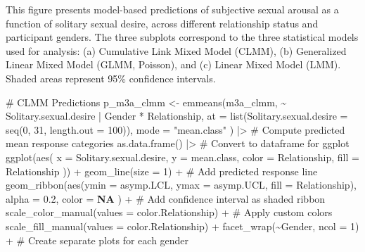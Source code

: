 \documentclass[
  bookmarksnumbered]{article}
\newenvironment{Shaded}{\begin{snugshade}}{\end{snugshade}}
\newcommand{\AttributeTok}[1]{\textcolor[rgb]{0.80,0.80,0.80}{#1}}
\newcommand{\CommentTok}[1]{\textcolor[rgb]{0.50,0.62,0.50}{#1}}
\newcommand{\ConstantTok}[1]{\textcolor[rgb]{0.86,0.64,0.64}{\textbf{#1}}}
\newcommand{\DecValTok}[1]{\textcolor[rgb]{0.86,0.86,0.80}{#1}}
\newcommand{\FloatTok}[1]{\textcolor[rgb]{0.75,0.75,0.82}{#1}}
\newcommand{\FunctionTok}[1]{\textcolor[rgb]{0.94,0.94,0.56}{#1}}
\newcommand{\NormalTok}[1]{\textcolor[rgb]{0.80,0.80,0.80}{#1}}
\newcommand{\OtherTok}[1]{\textcolor[rgb]{0.94,0.94,0.56}{#1}}
\newcommand{\SpecialCharTok}[1]{\textcolor[rgb]{0.86,0.64,0.64}{#1}}
\newcommand{\StringTok}[1]{\textcolor[rgb]{0.80,0.58,0.58}{#1}}
\begin{document}
This figure presents model-based predictions of subjective sexual arousal as a function of solitary sexual desire, across different relationship status and participant genders. The three subplots correspond to the three statistical models used for analysis: (a) Cumulative Link Mixed Model (CLMM), (b) Generalized Linear Mixed Model (GLMM, Poisson), and (c) Linear Mixed Model (LMM). Shaded areas represent 95\% confidence intervals.

\begin{Shaded}
\begin{Highlighting}[]
\CommentTok{\# CLMM Predictions}
\NormalTok{p\_m3a\_clmm }\OtherTok{\textless{}{-}} \FunctionTok{emmeans}\NormalTok{(m3a\_clmm, }\SpecialCharTok{\textasciitilde{}}\NormalTok{ Solitary.sexual.desire }\SpecialCharTok{|}\NormalTok{ Gender }\SpecialCharTok{*}\NormalTok{ Relationship,}
  \AttributeTok{at =} \FunctionTok{list}\NormalTok{(}\AttributeTok{Solitary.sexual.desire =} \FunctionTok{seq}\NormalTok{(}\DecValTok{0}\NormalTok{, }\DecValTok{31}\NormalTok{, }\AttributeTok{length.out =} \DecValTok{100}\NormalTok{)),}
  \AttributeTok{mode =} \StringTok{"mean.class"}
\NormalTok{) }\SpecialCharTok{|\textgreater{}} \CommentTok{\# Compute predicted mean response categories}
  \FunctionTok{as.data.frame}\NormalTok{() }\SpecialCharTok{|\textgreater{}} \CommentTok{\# Convert to dataframe for ggplot}
  \FunctionTok{ggplot}\NormalTok{(}\FunctionTok{aes}\NormalTok{(}
    \AttributeTok{x =}\NormalTok{ Solitary.sexual.desire, }\AttributeTok{y =}\NormalTok{ mean.class,}
    \AttributeTok{color =}\NormalTok{ Relationship, }\AttributeTok{fill =}\NormalTok{ Relationship}
\NormalTok{  )) }\SpecialCharTok{+}
  \FunctionTok{geom\_line}\NormalTok{(}\AttributeTok{size =} \DecValTok{1}\NormalTok{) }\SpecialCharTok{+} \CommentTok{\# Add predicted response line}
  \FunctionTok{geom\_ribbon}\NormalTok{(}\FunctionTok{aes}\NormalTok{(}\AttributeTok{ymin =}\NormalTok{ asymp.LCL, }\AttributeTok{ymax =}\NormalTok{ asymp.UCL, }\AttributeTok{fill =}\NormalTok{ Relationship),}
    \AttributeTok{alpha =} \FloatTok{0.2}\NormalTok{, }\AttributeTok{color =} \ConstantTok{NA}
\NormalTok{  ) }\SpecialCharTok{+} \CommentTok{\# Add confidence interval as shaded ribbon}
  \FunctionTok{scale\_color\_manual}\NormalTok{(}\AttributeTok{values =}\NormalTok{ color.Relationship) }\SpecialCharTok{+} \CommentTok{\# Apply custom colors}
  \FunctionTok{scale\_fill\_manual}\NormalTok{(}\AttributeTok{values =}\NormalTok{ color.Relationship) }\SpecialCharTok{+}
  \FunctionTok{facet\_wrap}\NormalTok{(}\SpecialCharTok{\textasciitilde{}}\NormalTok{Gender, }\AttributeTok{ncol =} \DecValTok{1}\NormalTok{) }\SpecialCharTok{+} \CommentTok{\# Create separate plots for each gender}

\end{Highlighting}
\end{Shaded}
\end{document}
